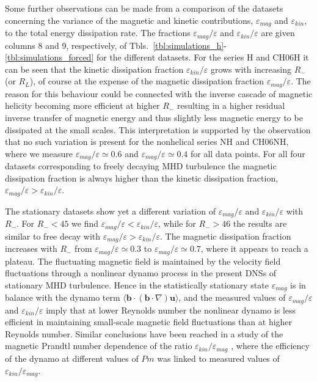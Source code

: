\documentclass[aps,pre,onecolumn,superscriptaddress,notitlepage]{revtex4-1}
\newcommand{\vep}{\varepsilon}
\renewcommand{\vec}[1]{\bm{#1}}
\newcommand{\blue}[1]{{#1}}
\begin{document}
\blue{Some further observations can be made from a comparison of the datasets
concerning the variance of the magnetic and kinetic contributions, $\vep_{mag}$ and
$\vep_{kin}$, to the total energy dissipation rate.  The fractions $\vep_{mag}/\vep$
and $\vep_{kin}/\vep$ are given columns 8 and 9, respectively, of
Tbls.~\ref{tbl:simulations_h}-\ref{tbl:simulations_forced} for the different
datasets. For the series H and CH06H it can be seen that the kinetic
dissipation fraction $\vep_{kin}/\vep$ grows with increasing $R_-$ (or $R_L$), of
course at the expense of the magnetic dissipation fraction $\vep_{mag}/\vep$.  The
reason for this behaviour could be connected with the inverse cascade of
magnetic helicity becoming more efficient at higher $R_-$ resulting in a higher
residual inverse transfer of magnetic energy and thus slightly less magnetic
energy to be dissipated at the small scales. This interpretation is supported
by the observation that no such variation is present for the nonhelical series
NH and CH06NH, where we measure $\vep_{mag}/\vep \simeq 0.6$ and $\vep_{mag}/\vep
\simeq 0.4$ for all data points.  For all four datasets corresponding to freely
decaying MHD turbulence the magnetic dissipation fraction is always higher than
the kinetic dissipation fraction, $\vep_{mag}/\vep > \vep_{kin}/\vep$. }

\blue{
The stationary datasets show yet
a different variation of $\vep_{mag}/\vep$ and $\vep_{kin}/\vep$ with $R_-$.  For $R_-
< 45$ we find $\vep_{mag}/\vep < \vep_{kin}/\vep$, while for $R_- > 46$ the results are
similar to free decay with $\vep_{mag}/\vep > \vep_{kin}/\vep$. The magnetic
dissipation fraction increases with $R_-$ from $\vep_{mag}/\vep \simeq 0.3$ to
$\vep_{mag}/\vep \simeq 0.7$, where it appears to reach a plateau. 
The fluctuating magnetic field is maintained by the
velocity field fluctuations through a nonlinear dynamo process in the present 
DNSs of stationary MHD turbulence. Hence in the statistically stationary state
$\vep_{mag}$ is in balance with the dynamo term 
$\langle \vec{b}\cdot (\vec{b}\cdot \nabla) \vec{u} \rangle$, and the measured
values of $\vep_{mag}/\vep$ and $\vep_{kin}/\vep$ imply that at lower Reynolds number 
the nonlinear dynamo is less efficient in maintaining small-scale magnetic field 
fluctuations than at higher Reynolds number. Similar conclusions have been reached 
in a study of the magnetic Prandtl number dependence of the ratio $\vep_{kin}/\vep_{mag}$ 
\cite{Brandenburg14b}, where the efficiency of the dynamo at different values of  
$Pm$ was linked to measured values of $\vep_{kin}/\vep_{mag}$.}
\end{document}
